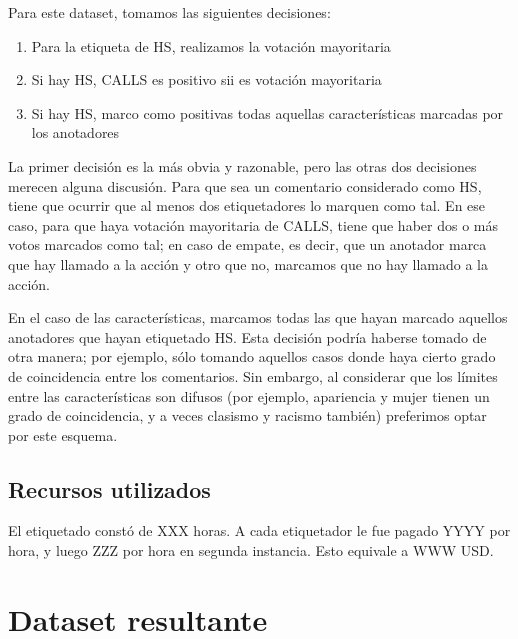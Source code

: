 Para este dataset, tomamos las siguientes decisiones:

\begin{enumerate}
    \item Para la etiqueta de HS, realizamos la votación mayoritaria
    \item Si hay HS, CALLS es positivo sii es votación mayoritaria
    \item Si hay HS, marco como positivas todas aquellas características marcadas por los anotadores
\end{enumerate}

La primer decisión es la más obvia y razonable, pero las otras dos decisiones merecen alguna discusión. Para que sea un comentario considerado como HS, tiene que ocurrir que al menos dos etiquetadores lo marquen como tal. En ese caso, para que haya votación mayoritaria de CALLS, tiene que haber dos o más votos marcados como tal; en caso de empate, es decir, que un anotador marca que hay llamado a la acción y otro que no, marcamos que no hay llamado a la acción.

En el caso de las características, marcamos todas las que hayan marcado aquellos anotadores que hayan etiquetado HS. Esta decisión podría haberse tomado de otra manera; por ejemplo, sólo tomando aquellos casos donde haya cierto grado de coincidencia entre los comentarios. Sin embargo, al considerar que los límites entre las características son difusos (por ejemplo, apariencia y mujer tienen un grado de coincidencia, y a veces clasismo y racismo también) preferimos optar por este esquema.


\subsection{Recursos utilizados}

El etiquetado constó de XXX horas. A cada etiquetador le fue pagado YYYY por hora, y luego ZZZ por hora en segunda instancia. Esto equivale a WWW USD.

\section{Dataset resultante}

